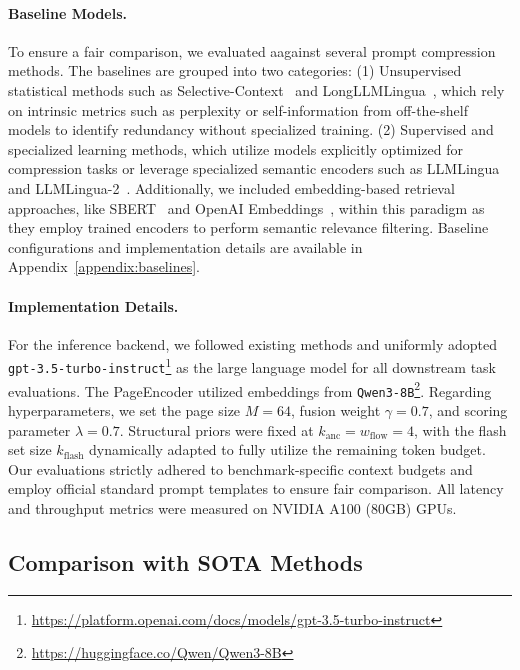 \documentclass[11pt]{article}
\newcommand{\ours}{\text{BEAVER}\xspace}
\begin{document}
\paragraph{Baseline Models.} To ensure a fair comparison, we evaluated \ours aagainst several prompt compression methods. The baselines are grouped into two categories: (1) Unsupervised statistical methods such as Selective-Context~\cite{li2023compressing} and LongLLMLingua~\cite{jiang2024longllmlingua}, which rely on intrinsic metrics such as perplexity or self-information from off-the-shelf models to identify redundancy without specialized training. (2) Supervised and specialized learning methods, which utilize models explicitly optimized for compression tasks or leverage specialized semantic encoders such as LLMLingua~\cite{jiang2023llmlingua} and LLMLingua-2~\cite{pan2024llmlingua2}. Additionally, we included embedding-based retrieval approaches, like SBERT~\cite{reimers2019sentence} and OpenAI Embeddings~\cite{openai_embeddings}, within this paradigm as they employ trained encoders to perform semantic relevance filtering. Baseline configurations and implementation details are available in Appendix~\ref{appendix:baselines}. 

\paragraph{Implementation Details.}
For the inference backend, we followed existing methods \cite{jiang2024longllmlingua,pan2024llmlingua2} and uniformly adopted \texttt{gpt-3.5-turbo-instruct}\footnote{\url{https://platform.openai.com/docs/models/gpt-3.5-turbo-instruct}} as the large language model for all downstream task evaluations. The PageEncoder utilized embeddings from \texttt{Qwen3-8B}\footnote{\url{https://huggingface.co/Qwen/Qwen3-8B}}.
Regarding hyperparameters, we set the page size $M=64$, fusion weight $\gamma=0.7$, and scoring parameter $\lambda=0.7$.
Structural priors were fixed at $k_{\mathrm{anc}}=w_{\mathrm{flow}}=4$, with the flash set size $k_{\mathrm{flash}}$ dynamically adapted to fully utilize the remaining token budget.
Our evaluations strictly adhered to benchmark-specific context budgets and employ official standard prompt templates to ensure fair comparison.
All latency and throughput metrics were measured on NVIDIA A100 (80GB) GPUs.

\subsection{Comparison with SOTA Methods}
\label{subsec:comparison}
\end{document}
